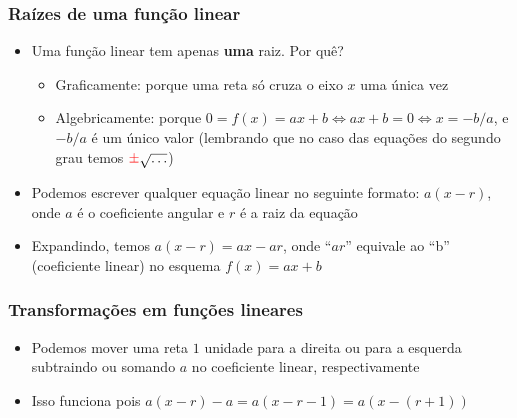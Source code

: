 \documentclass[usenames,dvipsnames,svgnames]{beamer}
\begin{document}
\begin{frame}
	\frametitle{Raízes de uma função linear}

	\begin{itemize}
		\item Uma função linear tem apenas \textbf{uma} raiz. Por quê?
		\begin{itemize}
			\item Graficamente: porque uma reta só cruza o eixo $x$ uma única vez
			\item Algebricamente: porque $0 = f(x) = ax + b \Leftrightarrow ax + b = 0 \Leftrightarrow x = -b/a$, e $-b/a$ é um único valor (lembrando que no caso das equações do segundo grau temos ${\color{red}\pm} \sqrt{\dots}$)
		\end{itemize}
		\item Podemos escrever qualquer equação linear no seguinte formato: $a(x-r)$, onde $a$ é o coeficiente angular e $r$ é a raiz da equação
		\item Expandindo, temos $a(x-r) = ax - ar$, onde ``$ar$'' equivale ao ``b'' (coeficiente linear) no esquema $f(x) = ax + b$
	\end{itemize}
\end{frame}

\begin{frame}
	\frametitle{Transformações em funções lineares}

	\begin{itemize}
		\item Podemos mover uma reta $1$ unidade para a direita ou para a esquerda subtraindo ou somando $a$ no coeficiente linear, respectivamente
		\item Isso funciona pois $a(x-r) - a = a(x-r-1) = a(x-(r+1))$
	\end{itemize}

	\begin{adjustbox}{max totalsize={\textwidth}{.6\textheight},center}
	\end{adjustbox}
\end{frame}
\end{document}

